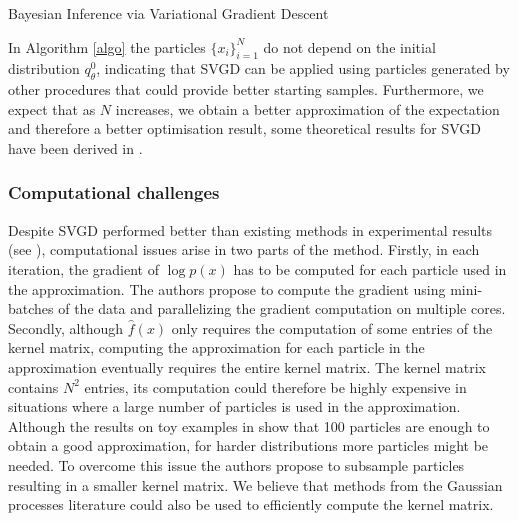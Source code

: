 \begin{algorithm}[H] \label{algo}
	\SetAlgoLined
	\caption{Bayesian Inference via Variational Gradient Descent}

\end{algorithm}

In Algorithm \ref{algo} the particles $\{x_i\}_{i=1}^N$ do not depend on the initial distribution $q_{\theta}^0$, indicating that SVGD can be applied using particles generated by other procedures that could provide better starting samples. Furthermore, we expect that as $N$ increases, we obtain a better approximation of the expectation and therefore a better optimisation result, some theoretical results for SVGD have been derived in \cite{liu2017stein, liu2018stein}.

\subsubsection{Computational challenges}
Despite SVGD performed better than existing methods in experimental results (see \cite{liu2016stein}), computational issues arise in two parts of the method. Firstly, in each iteration, the gradient of $\log p(x)$ has to be computed for each particle used in the approximation. The authors propose to compute the gradient using mini-batches of the data and parallelizing the gradient computation on multiple cores. Secondly, although $\hat{f}(x)$ only requires the computation of some entries of the kernel matrix, computing the approximation for each particle in the approximation eventually requires the entire kernel matrix. The kernel matrix contains $N^2$ entries, its computation could therefore be highly expensive in situations where a large number of particles is used in the approximation. Although the results on toy examples in \cite{liu2016stein} show that 100 particles are enough to obtain a good approximation, for harder distributions more particles might be needed. To overcome this issue the authors propose to subsample particles resulting in a smaller kernel matrix. We believe that methods from the Gaussian processes literature could also be used to efficiently compute the kernel matrix.

